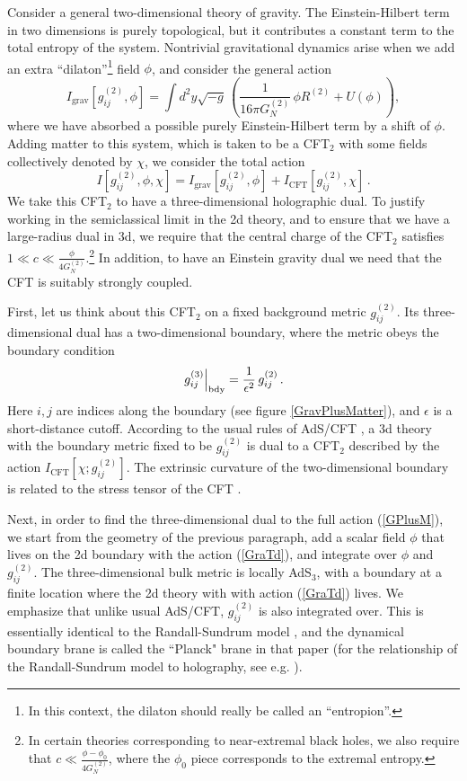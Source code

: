 \documentclass[12pt]{article}
\newcommand{\be}{\begin{equation}}
\newcommand{\ee}{\end{equation}}
\def\la{\label}
\def\nref#1{(\ref{#1})}
\begin{document}
Consider a general two-dimensional theory of gravity.  
The Einstein-Hilbert term in two dimensions is purely topological, but it contributes a constant term to the total entropy of the system.
Nontrivial gravitational dynamics arise when we add an extra ``dilaton''\footnote{In this context, the dilaton should really be called an ``entropion''.} field $\phi$, and consider the general action   
\be \la{GraTd}
I_{\text{grav}}[g^{(2)}_{ij}, \phi] = 
\int d^2y\sqrt{-g}\, \left( \frac{1}{16 \pi G_N^{(2)}} \, \phi R^{(2)} + U(\phi) \right),
\ee
where  we have absorbed a possible purely Einstein-Hilbert term by a shift of $\phi$.  
Adding matter to this system, which is taken to be a CFT$_2$ with some fields collectively denoted by $\chi$, we consider  the total action  
\be \la{GPlusM}
I[g^{(2)}_{ij}, \phi, \chi] = I_{\text{grav}}[g^{(2)}_{ij}, \phi] + I_{\text{CFT}}[g^{(2)}_{ij}, \chi] \, .
\ee
We take this  CFT$_2$ to have a three-dimensional holographic dual.
To justify working in the semiclassical limit in the 2d theory, and to ensure that we have a large-radius dual in 3d, we require that the central charge of the CFT$_2$ satisfies $1 \ll c \ll \frac{\phi}{4G_N^{(2)}}$.\footnote{In certain theories corresponding to near-extremal black holes, we also require that $c\ll \frac{\phi-\phi_0}{4G_N^{(2)}}$, where the $\phi_0$ piece corresponds to the extremal entropy.}
In addition, to have an Einstein gravity dual we need that the CFT is suitably strongly coupled.

First, let us think about this CFT$_2$ on a fixed background metric $g^{(2)}_{ij}$.
Its three-dimensional dual has a two-dimensional boundary, where the metric obeys the boundary condition %
\be \la{MetBC}
\left. g^{(3)}_{ij} \right|_{\rm bdy} = \frac{1}{\epsilon^2} 
\, g_{ij}^{(2)}\, .
\ee
Here $i,j$ are indices along the boundary (see figure \ref{GravPlusMatter}), and $\epsilon$ is a short-distance cutoff.
According to the  usual rules of AdS/CFT  \cite{Maldacena:1997re,Witten:1998qj,Gubser:1998bc}, a 3d theory with the boundary metric fixed to be $g_{ij}^{(2)}$ is dual to a CFT$_2$ described by the action $I_{ \text{CFT}}[\chi; g^{(2)}_{ij}]$.
The extrinsic curvature of the two-dimensional boundary is related to the stress tensor of the CFT  \cite{Balasubramanian:1999re}.

Next, in order to find the three-dimensional dual to the full action \nref{GPlusM}, we start from the geometry of the previous paragraph,
add a scalar field $\phi$ that lives on the 2d boundary with the action \nref{GraTd}, and integrate over $\phi$ and $g^{(2)}_{ij}$. 
The three-dimensional bulk metric is locally AdS$_3$, with a boundary at a finite location where the 2d theory with with action \nref{GraTd} lives.
We emphasize that unlike usual AdS/CFT, $g^{(2)}_{i j}$ is also integrated over.
This is essentially identical to the Randall-Sundrum model \cite{Randall:1999vf}, and the dynamical boundary brane is called the ``Planck" brane in that paper (for the relationship of the Randall-Sundrum model to holography, see e.g. \cite{Gubser:1999vj}).
\end{document}
